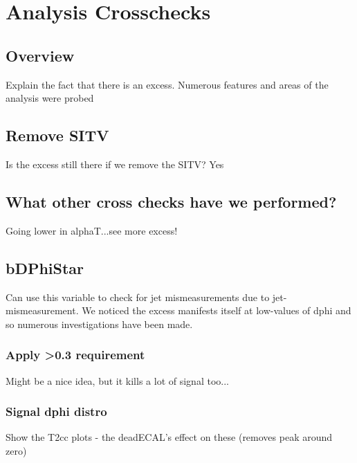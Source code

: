 \chapter{Analysis Crosschecks}

\ifpdf
    \graphicspath{{Chapter8/Figs/Raster/}{Chapter8/Figs/PDF/}{Chapter8/Figs/}}
\else
    \graphicspath{{Chapter8/Figs/Vector/}{Chapter8/Figs/}}
\fi

\section{Overview}  %
\label{sec:crosschecks_overview}
Explain the fact that there is an excess. Numerous features and areas of the 
analysis were probed

\section{Remove SITV}
\label{sec:crosschecks_nositv}
Is the excess still there if we remove the SITV? Yes

\section{What other cross checks have we performed?}
\label{sec:crosschecks_other}
Going lower in alphaT...see more excess!

\section{bDPhiStar}
\label{sec:crosschecks_dphi}
Can use this variable to check for jet mismeasurements due to jet-
mismeasurement. We noticed the excess manifests itself at low-values of dphi and
so numerous investigations have been made.

\subsection{Apply >0.3 requirement}

Might be a nice idea, but it kills a lot of signal too...

\subsection{Signal dphi distro}
Show the T2cc plots - the deadECAL's effect on these (removes peak around zero)

